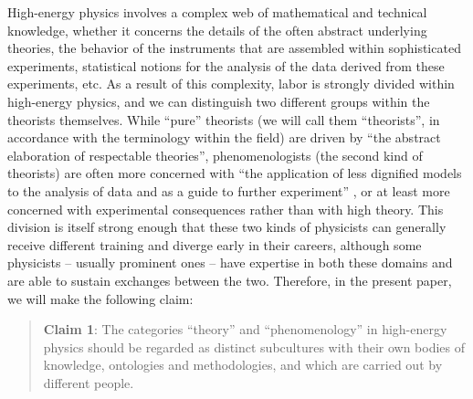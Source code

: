 \documentclass[smallextended]{svjour3}
\begin{document}
High-energy physics involves a complex web of mathematical and technical knowledge, whether it concerns the details of the often abstract underlying theories, the behavior of the instruments that are assembled within sophisticated experiments, statistical notions for the analysis of the data derived from these experiments, etc. As a result of this complexity, labor is strongly divided within high-energy physics, and we can distinguish two different groups within the theorists themselves.  While ``pure'' theorists (we will call them ``theorists'', in accordance with the terminology within the field) are driven by ``the abstract elaboration of respectable theories'', phenomenologists (the second kind of theorists) are often more concerned with ``the application of less dignified models to the analysis of data and as a
guide to further experiment'' \citep{pickering1984constructing}, or at least more concerned with experimental consequences rather than with high theory. This division is itself strong enough that these two kinds of physicists can generally receive different training and diverge early in their careers, although some physicists -- usually prominent ones -- have expertise in both these domains and are able to sustain exchanges between the two. Therefore, in the present paper, we will make the following claim:

\begin{quote}
    \textbf{Claim 1}: The categories ``theory'' and ``phenomenology'' in high-energy physics should be regarded as distinct subcultures with their own bodies of knowledge, ontologies and methodologies, and which are carried out by different people.
\end{quote}
\end{document}
